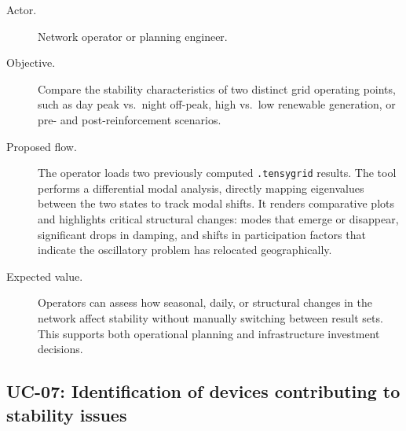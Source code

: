 \begin{description}
  \item[Actor.] Network operator or planning engineer.
  \item[Objective.] Compare the stability characteristics of two distinct grid operating points, such as day peak vs.\ night off-peak, high vs.\ low renewable generation, or pre- and post-reinforcement scenarios.
  \item[Proposed flow.] The operator loads two previously computed \texttt{.tensygrid} results. The tool performs a differential modal analysis, directly mapping eigenvalues between the two states to track modal shifts. It renders comparative plots and highlights critical structural changes: modes that emerge or disappear, significant drops in damping, and shifts in participation factors that indicate the oscillatory problem has relocated geographically.
  \item[Expected value.] Operators can assess how seasonal, daily, or structural changes in the network affect stability without manually switching between result sets. This supports both operational planning and infrastructure investment decisions.
\end{description}

\subsection{UC-07: Identification of devices contributing to stability issues}

